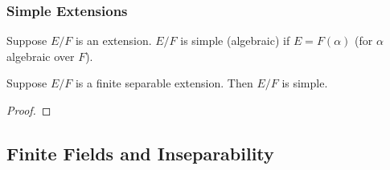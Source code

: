 \subsubsection*{Simple Extensions}

\begin{definition}
    Suppose \(E/F\) is an extension.
    \(E/F\) is simple (algebraic)
    if \(E = F(\alpha)\) (for \(\alpha\) algebraic over \(F\)).
\end{definition}
\begin{theorem}
    Suppose \(E/F\) is a finite separable extension.
    Then \(E/F\) is simple.
\end{theorem}
\begin{proof}
\end{proof}


\subsection{Finite Fields and Inseparability}
